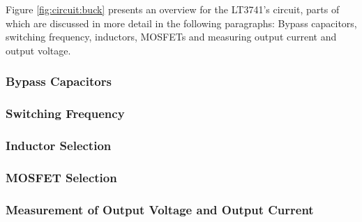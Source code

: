 Figure \ref{fig:circuit:buck}  presents an overview for  the LT3741's circuit,
parts  of which  are discussed  in more  detail in  the following  paragraphs:
Bypass  capacitors,  switching  frequency, inductors,  MOSFETs  and  measuring
output current and output voltage.


\subsubsection{Bypass Capacitors}



\subsubsection{Switching Frequency}



\subsubsection{Inductor Selection}
\label{subsubsec:lt3741:inductors}



\subsubsection{MOSFET Selection}
\label{subsubsec:lt3741:mosfets}



\subsubsection{Measurement of Output Voltage and Output Current}

